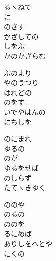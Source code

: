 \documentclass[10pt,b5j]{tarticle} %
\begin{document}
\vspace{1.5em} %
\newcommand{\linespace}{0.5em} %
\newcommand{\blocksize}{0.5\hsize} %
\begin{enumerate} %
    \begin{minipage}[c]{\blocksize}
    
        \vspace{\linespace}
        \item
        るヽねて\\
        に\\
        のさす\\
        かざしての\\
        しをぶ\\
        かのかざらむ
        
        \vspace{\linespace}
        \item
        ぶのより\\
        やのうつり\\
        はれどの\\
        のをす\\
        いでやはんの\\
        にちしを
        
        \vspace{\linespace}
        \item
        のにまれ\\
        ゆるの\\
        のが\\
        ゆるをせば\\
        のしらず\\
        たてヽきゆく
        
        \vspace{\linespace}
        \item
        ののや\\
        のるの\\
        ののを\\
        るにめば\\
        ありしをへとや\\
        にくの
        

\end{minipage}
\end{enumerate}
\end{document}
